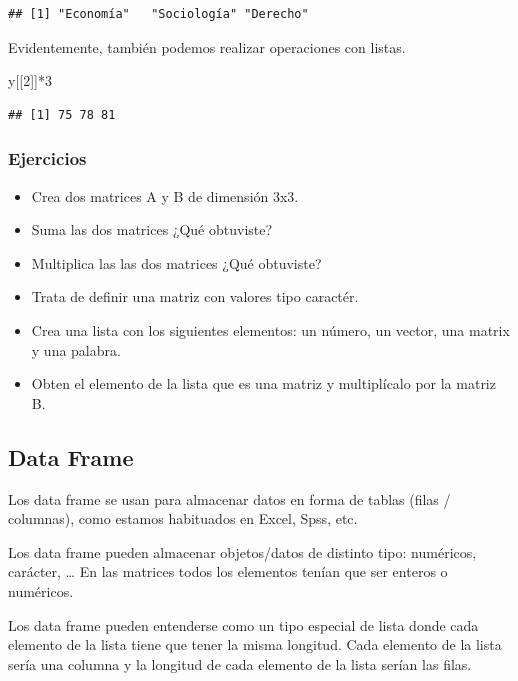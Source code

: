 \documentclass[
]{book}
\newenvironment{Shaded}{\begin{snugshade}}{\end{snugshade}}
\newcommand{\DecValTok}[1]{\textcolor[rgb]{0.00,0.00,0.81}{#1}}
\newcommand{\NormalTok}[1]{#1}
\newcommand{\SpecialCharTok}[1]{\textcolor[rgb]{0.00,0.00,0.00}{#1}}
\providecommand{\tightlist}{%
  \setlength{\itemsep}{0pt}\setlength{\parskip}{0pt}}
\begin{document}
\begin{verbatim}
## [1] "Economía"   "Sociología" "Derecho"
\end{verbatim}

Evidentemente, también podemos realizar operaciones con listas.

\begin{Shaded}
\begin{Highlighting}[]
\NormalTok{y[[}\DecValTok{2}\NormalTok{]]}\SpecialCharTok{*}\DecValTok{3}
\end{Highlighting}
\end{Shaded}

\begin{verbatim}
## [1] 75 78 81
\end{verbatim}

\hypertarget{ejercicios-1}{%
\subsubsection{Ejercicios}\label{ejercicios-1}}

\begin{itemize}
\tightlist
\item
  Crea dos matrices A y B de dimensión 3x3.
\item
  Suma las dos matrices ¿Qué obtuviste?
\item
  Multiplica las las dos matrices ¿Qué obtuviste?
\item
  Trata de definir una matriz con valores tipo caractér.
\item
  Crea una lista con los siguientes elementos: un número, un vector, una matrix y una palabra.
\item
  Obten el elemento de la lista que es una matriz y multiplícalo por la matriz B.
\end{itemize}

\hypertarget{data-frame}{%
\subsection{Data Frame}\label{data-frame}}

Los data frame se usan para almacenar datos en forma de tablas (filas / columnas), como estamos habituados en Excel, Spss, etc.

Los data frame pueden almacenar objetos/datos de distinto tipo: numéricos, carácter, \ldots{} En las matrices todos los elementos tenían que ser enteros o numéricos.

Los data frame pueden entenderse como un tipo especial de lista donde cada elemento de la lista tiene que tener la misma longitud. Cada elemento de la lista sería una columna y la longitud de cada elemento de la lista serían las filas.
\end{document}
